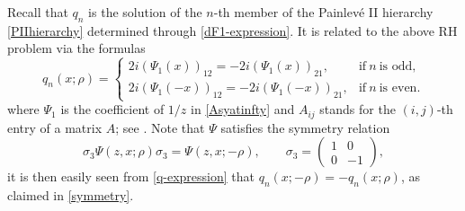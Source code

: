\documentclass[11pt,a4paper]{article}
\numberwithin{equation}{section}
\begin{document}
Recall that $q_{n}$ is the solution of the $n$-th member of the Painlev\'e II hierarchy \eqref{PIIhierarchy} determined through \eqref{dF1-expression}. It is related to the above RH problem via the formulas
\begin{equation}\label{q-expression}
q_{n}(x;\rho)= \begin{cases}2 i\left(\Psi_{1}(x)\right)_{12}=-2 i\left(\Psi_{1}(x)\right)_{21}, & \text{if}~n~\text{is~odd}, \\
2 i\left(\Psi_{1}(-x)\right)_{12}=-2 i\left(\Psi_{1}(-x)\right)_{21}, & \text{if}~n~ \text{is~even}.\end{cases}
\end{equation}
where $\Psi_1$ is the coefficient of $1/z$  in \eqref{Asyatinfty} and $A_{ij}$ stands for the $(i,j)$-th entry of a matrix $A$; see \cite[Equation (2.27)]{CCG2021}. Note that $\Psi$ satisfies the symmetry relation
\begin{equation}\label{eq:PsiSymm}
\sigma_3\Psi(z,x;\rho)\sigma_3=\Psi(z,x;-\rho),\qquad \sigma_3=\begin{pmatrix} 1 & 0\\ 0 & -1 \end{pmatrix},
\end{equation}
it is then easily seen from \eqref{q-expression} that $q_{n}(x;-\rho)=-q_{n}(x;\rho)$, as claimed in \eqref{symmetry}.

\end{document}
